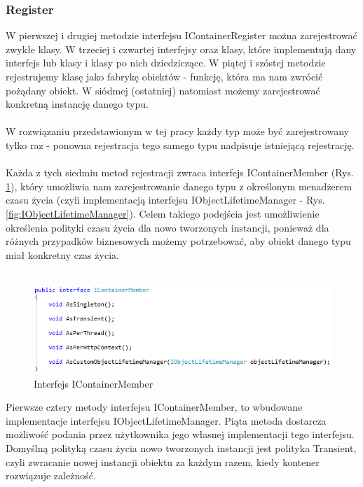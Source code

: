 \documentclass[12pt]{article}
\begin{document}
\subsubsection{Register}
W pierwszej i drugiej metodzie interfejsu IContainerRegister można zarejestrować zwykłe klasy. W trzeciej i czwartej interfejsy oraz klasy, które implementują dany interfejs lub klasy i klasy po nich dziedziczące. W piątej i szóstej metodzie rejestrujemy klasę jako fabrykę obiektów - funkcję, która ma nam zwrócić pożądany obiekt. W siódmej (ostatniej) natomiast możemy zarejestrować konkretną instancję danego typu.\\
\\
W rozwiązaniu przedstawionym w tej pracy każdy typ może być zarejestrowany tylko raz - ponowna rejestracja tego samego typu nadpisuje istniejącą rejestrację.\\
\\
Każda z tych siedmiu metod rejestracji zwraca interfejs IContainerMember (Rys. \ref{fig:IContainerMember}), który umożliwia nam zarejestrowanie danego typu z określonym menadżerem czasu życia (czyli implementacją interfejsu IObjectLifetimeManager - Rys. \ref{fig:IObjectLifetimeManager}). Celem takiego podejścia jest umożliwienie określenia polityki czasu życia dla nowo tworzonych instancji, ponieważ dla różnych przypadków biznesowych możemy potrzebować, aby obiekt danego typu miał konkretny czas życia.\\ \\
\begin{figure}[H]
	\begin{center}
  		\includegraphics{IContainerMember.png}
  		\caption{Interfejs IContainerMember}
  		\label{fig:IContainerMember}
	\end{center}
\end{figure}
Pierwsze cztery metody interfejsu IContainerMember, to wbudowane implementacje interfejsu IObjectLifetimeManager. Piąta metoda dostarcza możliwość podania przez użytkownika jego własnej implementacji tego interfejsu. Domyślną polityką czasu życia nowo tworzonych instancji jest polityka Transient, czyli zwracanie nowej instancji obiektu za każdym razem, kiedy kontener rozwiązuje zależność.\\
\end{document}
